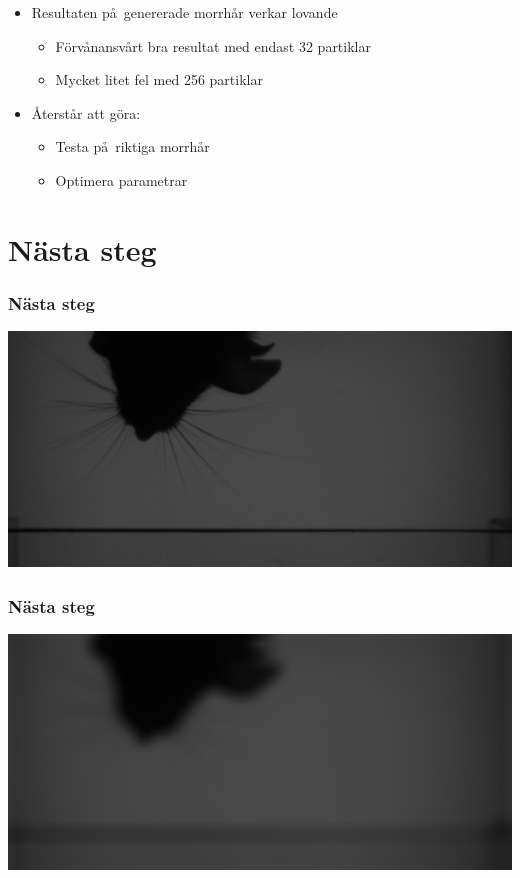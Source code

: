 \documentclass[]{beamer}
\renewcommand{\ae}{\"{a}}
\renewcommand{\oe}{\"{o}}
\begin{document}
\begin{frame}
  \begin{itemize}
  \item Resultaten p\aa\ genererade morrh\aa r verkar lovande
    \begin{itemize}
      \item F\oe rv\aa nansv\aa rt bra resultat med endast 32 partiklar
      \item Mycket litet fel med 256 partiklar
      \end{itemize}
  \item \AA terst\aa r att g\oe ra:
    \begin{itemize}
    \item Testa p\aa\ riktiga morrh\aa r
    \item Optimera parametrar
    \end{itemize}
  \end{itemize}
\end{frame}

\section{N\ae sta steg}



\begin{frame}
  \frametitle{N\ae sta steg}
  \includegraphics[width=1\textwidth]{preprocessing/frame-0759.png}
\end{frame}

\begin{frame}
  \frametitle{N\ae sta steg}
  \includegraphics[width=1\textwidth]{preprocessing/frame-0759_blured.png}
\end{frame}
\end{document}
